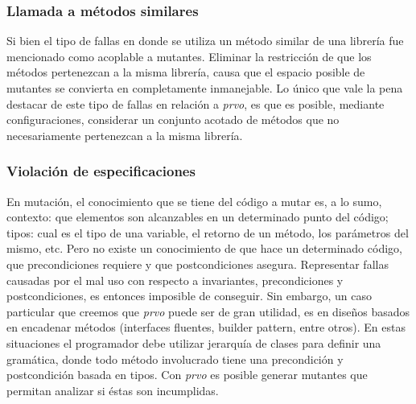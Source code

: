 \subsubsection{Llamada a m\'etodos similares}

Si bien el tipo de fallas en donde se utiliza un m\'etodo similar de una librer\'ia fue mencionado como acoplable a mutantes. Eliminar la restricci\'on de que los m\'etodos pertenezcan a la misma librer\'ia, causa que el espacio posible de mutantes se convierta en completamente inmanejable. Lo \'unico que vale la pena destacar de este tipo de fallas en relaci\'on a \emph{prvo}, es que es posible, mediante configuraciones, considerar un conjunto acotado de m\'etodos que no necesariamente pertenezcan a la misma librer\'ia.

\subsubsection{Violaci\'on de especificaciones}

En mutaci\'on, el conocimiento que se tiene del c\'odigo a mutar es, a lo sumo, contexto: que elementos son alcanzables en un determinado punto del c\'odigo; tipos: cual es el tipo de una variable, el retorno de un m\'etodo, los par\'ametros del mismo, etc. Pero no existe un conocimiento de que hace un determinado c\'odigo, que precondiciones requiere y que postcondiciones asegura. Representar fallas causadas por el mal uso con respecto a invariantes, precondiciones y postcondiciones, es entonces imposible de conseguir. Sin embargo, un caso particular que creemos que \emph{prvo} puede ser de gran utilidad, es en dise\~nos basados en encadenar m\'etodos (interfaces fluentes, builder pattern, entre otros). En estas situaciones el programador debe utilizar jerarqu\'ia de clases para definir una gram\'atica, donde todo m\'etodo involucrado tiene una precondici\'on y postcondici\'on basada en tipos. Con \emph{prvo} es posible generar mutantes que permitan analizar si \'estas son incumplidas.

